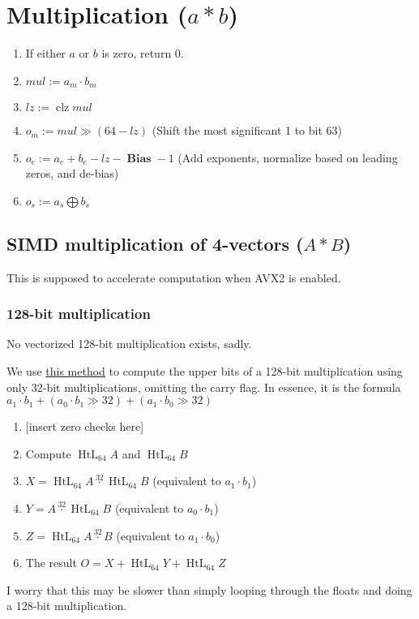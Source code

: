 \documentclass[12pt]{article}
\DeclareMathOperator{\bias}{\textbf{Bias}}
\DeclareMathOperator{\htl}{HtL}
\DeclareMathOperator{\clz}{clz}
\begin{document}
    \section{Multiplication ($a * b$)}\label{sec:multiplication}
    \begin{enumerate}
        \item If either $a$ or $b$ is zero, return 0.
        \item $mul := a_m \cdot b_m$
        \item $lz := \clz mul$
        \item $o_m := mul \gg (64 - lz)$ (Shift the most significant 1 to bit 63)
        \item $o_e := a_e + b_e - lz - \bias - 1$ (Add exponents, normalize based on leading zeros, and de-bias)
        \item $o_s := a_s \bigoplus b_s$
    \end{enumerate}

    \subsection{SIMD multiplication of 4-vectors ($A * B$)}\label{subsec:multiplication-simd}

    This is supposed to accelerate computation when AVX2 is enabled.

    \subsubsection{128-bit multiplication}

    No vectorized 128-bit multiplication exists, sadly.

    We use \href{https://stackoverflow.com/a/28904636/12947037}{this method} to compute the upper bits of a 128-bit multiplication using only 32-bit multiplications, omitting the carry flag.
    In essence, it is the formula $a_1 \cdot b_1 + (a_0 \cdot b_1 \gg 32) + (a_1 \cdot b_0 \gg 32)$

    \begin{enumerate}
        \item {[insert zero checks here]}
        \item Compute $\htl_{64} A$ and $\htl_{64} B$
        \item $X = \htl_{64} A \stackrel{32}{\cdot} \htl_{64} B$ (equivalent to $a_1 \cdot b_1$)
        \item $Y = A \stackrel{32}{\cdot} \htl_{64} B$ (equivalent to $a_0 \cdot b_1$)
        \item $Z = \htl_{64} A \stackrel{32}{\cdot} B$ (equivalent to $a_1 \cdot b_0$)
        \item The result $O = X + \htl_{64} Y + \htl_{64} Z$
    \end{enumerate}

    I worry that this may be slower than simply looping through the floats and doing a 128-bit multiplication.
\end{document}
